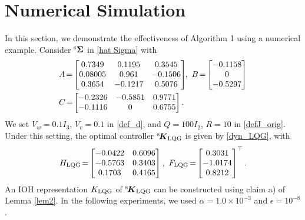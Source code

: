 \documentclass[preprint,5p,times,twocolumn]{elsarticle}
\newcommand{\bm}[1]{{\mbox{\boldmath $#1$}}}
\def\rmsK{{}^{\rm s}\hspace{-0.4mm}}
\begin{document}
\section{Numerical Simulation}
In this section, we demonstrate the effectiveness of Algorithm 1 using a numerical example. Consider $^{\rm s}{\bf \Sigma}$ in \eqref{hat Sigma} with
\begin{align}
\hspace{-0mm}
 &A \hspace{-0.5mm}=\hspace{-0.5mm} \begin{bmatrix}
 0.7349 &  0.1195 & 0.3545\\
    0.08005 & 0.961 &    -0.1506\\
    0.3654 & -0.1217 & 0.5076 
\end{bmatrix}\hspace{-1mm}, ~
B \hspace{-0.5mm}=\hspace{-0.5mm} \begin{bmatrix}
 -0.1158 \\
   0\\
-0.5297
\end{bmatrix} \nonumber \\
&C \hspace{-0.5mm}=\hspace{-0.5mm} 
\begin{bmatrix}    
-0.2326 & -0.5851 & 0.9771 \\
-0.1116 & 0 & 0.6755
\end{bmatrix}. \nonumber
\end{align}
We set $V_w = 0.1I_3$, $V_v = 0.1$ in \eqref{def_d}, and $Q=100I_2$, $R=10$ in \eqref{defJ_orig}. Under this setting, the optimal controller $\rmsK {\bm K}_{\rm LQG}$ is given by \eqref{dyn_LQG}, with 
\begin{align}
    H_{\rm LQG} \hspace{-0.5mm}=\hspace{-0.5mm} 
    \begin{bmatrix} 
-0.0422 & 0.6096 \\
-0.5763 & 0.3403 \\
0.1703 & 0.4165
\end{bmatrix},~ F_{\rm LQG} \hspace{-0.5mm}=\hspace{-0.5mm} 
\begin{bmatrix}    
0.3031\\
-1.0174\\
0.8212
\end{bmatrix}^{\top}. \nonumber 
\end{align}
An IOH representation  $K_{\rm LQG}$ of $\rmsK {\bm K}_{\rm LQG}$ can be constructed using claim a) of Lemma \ref{lem2}. In the following experiments, we used $\alpha = 1.0\times10^{-3}$ and ${\epsilon} = 10^{-8}$. 
\end{document}

